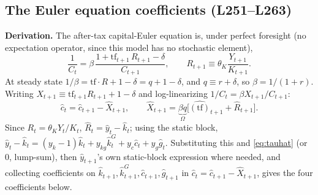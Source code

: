 \documentclass[11pt]{article}
\newcommand{\eq}[1]{\begin{equation}#1\end{equation}}
\begin{document}
\subsection{The Euler equation coefficients (L251--L263)}
\label{sec:euler}

\textbf{Derivation.} The after-tax capital-Euler equation is, under
perfect foresight (no expectation operator, since this model has no
stochastic element),
\eq{ \frac{1}{C_t} = \beta\,\frac{1+\text{tf}_{t+1}\,R_{t+1}-\delta}{C_{t+1}}, \qquad
     R_{t+1}\equiv\theta_K\frac{Y_{t+1}}{K_{t+1}}. }
At steady state $1/\beta=\text{tf}\cdot R+1-\delta=q+1-\delta$, and $q\equiv
r+\delta$, so $\beta=1/(1+r)$. Writing $X_{t+1}\equiv\text{tf}_{t+1}R_{t+1}+1-\delta$
and log-linearizing $1/C_t=\beta X_{t+1}/C_{t+1}$:
\eq{ \hat c_t=\hat c_{t+1}-\hat X_{t+1}, \qquad
     \hat X_{t+1} = \underbrace{\beta q}_{\displaystyle\Omega}
     \Big[\widehat{(\text{tf})}_{t+1}+\hat R_{t+1}\Big]. }
Since $R_t=\theta_K Y_t/K_t$, $\hat R_t=\hat y_t-\hat k_t$; using the static
block, $\hat y_t-\hat k_t=(y_k-1)\hat k_t+y_{kg}\hat k^G_t+y_c\hat c_t+y_g\hat
g_t$. Substituting this and \eqref{eq:tauhat} (or $0$, lump-sum), then $\hat
y_{t+1}$'s own static-block expression where needed, and collecting
coefficients on $\hat k_{t+1},\hat k^G_{t+1},\hat c_{t+1},\hat g_{t+1}$ in
$\hat c_t=\hat c_{t+1}-\hat X_{t+1}$, gives the four coefficients below.
\end{document}
